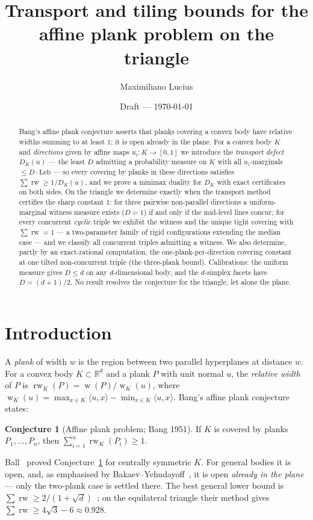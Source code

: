 \documentclass[11pt,reqno]{amsart}
\title{Transport and tiling bounds for the affine plank problem on the triangle}
\author{Maximiliano Lucius}
\date{Draft --- \today}
\theoremstyle{plain}
\theoremstyle{definition}
\newtheorem{conjecture}[theorem]{Conjecture}
\theoremstyle{remark}
\newcommand{\rw}{\operatorname{rw}}
\newcommand{\R}{\mathbb{R}}
\DeclareMathOperator{\wid}{w}
\begin{document}
\begin{abstract}
Bang's affine plank conjecture asserts that planks covering a convex body have
relative widths summing to at least $1$; it is open already in the plane. For a
convex body $K$ and \emph{directions} given by affine maps $u_i:K\to[0,1]$ we
introduce the \emph{transport defect} $D_K(u)$ --- the least $D$ admitting a
probability measure on $K$ with all $u_i$-marginals $\le D\cdot\mathrm{Leb}$
--- so every covering by planks in these directions satisfies
$\sum\rw\ge1/D_K(u)$, and we prove a minimax duality for $D_K$ with exact
certificates on both sides. On the triangle we determine exactly when the
transport method certifies the sharp constant $1$: for three pairwise
non-parallel directions a uniform-marginal witness measure exists ($D=1$) if
and only if the mid-level lines concur; for every concurrent \emph{cyclic}
triple we exhibit the witness and the unique tight covering with $\sum\rw=1$
--- a two-parameter family of rigid configurations extending the median case
--- and we classify all concurrent triples admitting a witness. We also
determine, partly by an exact-rational computation, the one-plank-per-direction
covering constant at one tilted non-concurrent triple (the three-plank bound).
Calibrations: the uniform measure gives $D\le d$ on any $d$-dimensional body,
and the $d$-simplex facets have $D=(d+1)/2$. No result resolves the conjecture
for the triangle, let alone the plane.
\end{abstract}
\maketitle

\section{Introduction}\label{sec:intro}

A \emph{plank} of width $w$ is the region between two parallel hyperplanes at
distance $w$. For a convex body $K\subset\R^d$ and a plank $P$ with unit normal $u$,
the \emph{relative width} of $P$ is $\rw_K(P)=\wid(P)/\wid_K(u)$, where
$\wid_K(u)=\max_{x\in K}\langle u,x\rangle-\min_{x\in K}\langle u,x\rangle$. Bang's
affine plank conjecture~\cite{Bang51,Ambrus} states:
\begin{conjecture}[Affine plank problem; Bang 1951]\label{conj:bang}
If $K$ is covered by planks $P_1,\dots,P_n$, then $\sum_{i=1}^n \rw_K(P_i)\ge 1$.
\end{conjecture}
Ball~\cite{Ball91} proved Conjecture~\ref{conj:bang} for centrally symmetric $K$.
For general bodies it is open, and, as emphasised by Bakaev--Yehudayoff~\cite{BY26},
it is open \emph{already in the plane} --- only the two-plank case is settled there.
The best general lower bound is
$\sum\rw\ge 2/(1+\sqrt d)$~\cite{BY26}; on the equilateral triangle their method
gives $\sum\rw\ge 4\sqrt3-6\approx0.928$.
\end{document}
